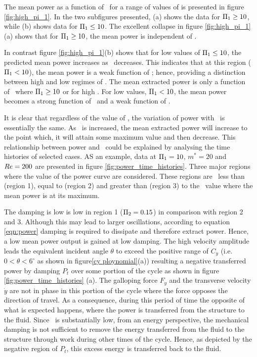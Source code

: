 The mean power as a function of \massdamp \ for a range of values of \massstiff is presented in figure \ref{fig:high_pi_1}. In the two subfigures presented, (a) shows the data for $\Pi_1 \geq 10$, while (b) shows data for $\Pi_1 \leq 10$.  The excellent collapse in figure \ref{fig:high_pi_1}(a) shows that for $\Pi_1 \geq 10$, the mean power is independent of \massstiff.

In contrast figure \ref{fig:high_pi_1}(b) shows that for low values of $\Pi_1 \leq 10$, the predicted mean power increases as \massdamp \ decreases. This indicates that at this region ($\Pi_1 < 10$), the mean power is a weak function of \massstiff; hence, providing a distinction between high and low regimes of \massstiff. The mean extracted power is only a function of \massdamp \ where $\Pi_1 \geq 10$ or for high \massstiff. For low values, $\Pi_1 < 10$, the mean power becomes a strong function of \massdamp \ and a weak function of \massstiff.

It is clear that regardless of the value of \massstiff, the variation of power with \massdamp \ is essentially the same. As \massdamp \ is increased, the mean extracted power will increase to the point which, it will attain some maximum value and then decrease. This relationship between power and \massdamp \ could be explained by analysing the time histories of selected cases. 
AS an example, data at $\Pi_1=10$, $m^*=20$ and $Re=200$ are presented in figure \ref{fig:power_time_histories}. Three major regions where the value of the power curve are considered. These regions are \massdamp\ less than (region 1), equal to (region 2) and greater than (region 3) to the \massdamp\ value where the mean power is at its maximum.



The damping is low is low in region 1 ($\Pi_2=0.15$) in comparison with region 2 and 3. Although this may lead to larger oscillations, according to equation \ref{eqn:power} damping is required to dissipate and therefore extract power. Hence, a low mean power output is gained at low damping. The high velocity amplitude leads the equivalent incident angle $\theta$ to exceed the positive range of $C_y$ (i.e. $0<\theta<6^\circ$ as shown in figure\ref{cy ploynomial}(a)) resulting a negative transferred power by damping $P_t$ over some portion of the cycle as shown in figure \ref{fig:power_time_histories} (a). The galloping force $F_y$ and the transverse velocity $\dot{y}$ are not in phase in this portion of the cycle where the force opposes the direction of travel. As a consequence, during this period of time the opposite of what is expected happens, where the power is transferred from the structure to the fluid. Since \massdamp \ is substantially low, from an energy perspective, the mechanical damping is not sufficient to remove the energy transferred from the fluid to the structure through work during other times of the cycle. Hence, as depicted by the negative region of $P_t$, this excess energy is transferred back to the fluid.



